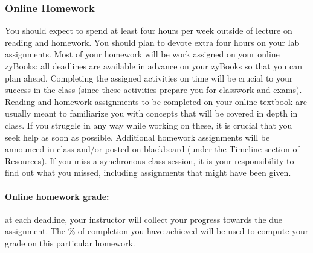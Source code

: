 \documentclass[12pt]{scrartcl}
\newcommand{\change}[2]{#2}
\begin{document}
\subsubsection{Online Homework} 
You should expect to spend at least four hours per week outside of lecture on reading and homework. You should plan to devote extra four hours on your lab assignments. 
Most of your homework will be work assigned on your online zyBooks: 
all deadlines are available in advance on your zyBooks so that you can plan ahead. 
Completing the assigned activities on time will be crucial to your success in the class (since these activities prepare you for classwork and exams). 
Reading and homework assignments to be completed on your online textbook are usually meant to familiarize you with concepts that will be covered in depth in class. 
If you struggle in any way while working on these, it is crucial that you seek help as soon as possible.
\change{Reading and}{Additional} homework assignments will be announced in class and/or posted on blackboard (under the Timeline section of Resources).
If you miss a \change{lecture}{synchronous class} session, it is your responsibility to find out what you missed, including assignments that might have been given\change{ in class}.


\paragraph{Online homework grade:} at each deadline, your instructor will collect your progress towards the due assignment. 
The \% of completion you have achieved will be used to compute your grade on this particular homework. 
\end{document}
